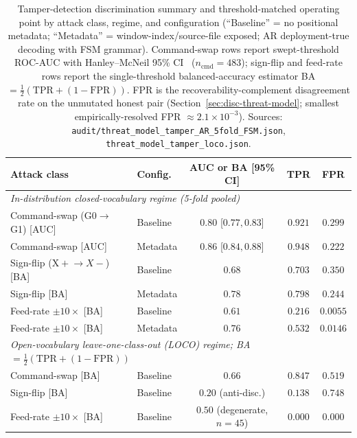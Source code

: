 \documentclass[sensors,article,submit,moreauthors,pdftex]{Definitions/mdpi}
\begin{document}
\begin{table}[!htbp]
\centering
\caption{Tamper-detection discrimination summary and threshold-matched operating point by attack class, regime, and configuration (``Baseline'' = no positional metadata; ``Metadata'' = window-index/source-file exposed; AR deployment-true decoding with FSM grammar). Command-swap rows report swept-threshold ROC-AUC with Hanley--McNeil 95\% CI~\cite{hanley1982meaning} ($n_{\text{cmd}}\!=\!483$); sign-flip and feed-rate rows report the single-threshold balanced-accuracy estimator BA$=\!\tfrac{1}{2}(\mathrm{TPR}+(1-\mathrm{FPR}))$. FPR is the recoverability-complement disagreement rate on the unmutated honest pair (Section~\ref{sec:disc-threat-model}; smallest empirically-resolved FPR $\approx\!2.1\!\times\!10^{-3}$). Sources: \texttt{audit/threat\_model\_tamper\_AR\_5fold\_FSM.json}, \texttt{threat\_model\_tamper\_loco.json}.}
\label{tab:tamper_auc}
\footnotesize
\setlength{\tabcolsep}{4pt}
\begin{tabular}{l l c c c}
\toprule
\textbf{Attack class} & \textbf{Config.} & \textbf{AUC or BA [95\% CI]} & \textbf{TPR} & \textbf{FPR} \\
\midrule
\multicolumn{5}{l}{\emph{In-distribution closed-vocabulary regime (5-fold pooled)}} \\
Command-swap (G0$\to$G1) [AUC]   & Baseline & $0.80$ \tiny{[$0.77, 0.83$]} & $0.921$ & $0.299$ \\
Command-swap [AUC]               & Metadata  & $0.86$ \tiny{[$0.84, 0.88$]} & $0.948$ & $0.222$ \\
Sign-flip (X$\!+\!\to\!X-$) [BA] & Baseline & $0.68$ & $0.703$ & $0.350$ \\
Sign-flip [BA]                   & Metadata  & $0.78$ & $0.798$ & $0.244$ \\
Feed-rate $\pm 10\times$ [BA]    & Baseline & $0.61$ & $0.216$ & $0.0055$ \\
Feed-rate $\pm 10\times$ [BA]    & Metadata  & $0.76$ & $0.532$ & $0.0146$ \\
\midrule
\multicolumn{5}{l}{\emph{Open-vocabulary leave-one-class-out (LOCO) regime; BA$\!=\!\tfrac{1}{2}(\mathrm{TPR}+(1-\mathrm{FPR}))$}} \\
Command-swap [BA]                & Baseline & $0.66$ & $0.847$ & $0.519$ \\
Sign-flip [BA]                   & Baseline & $0.20$ \tiny{(anti-disc.)} & $0.138$ & $0.748$ \\
Feed-rate $\pm 10\times$ [BA]    & Baseline & $0.50$ \tiny{(degenerate, $n\!=\!45$)} & $0.000$ & $0.000$ \\
\bottomrule
\end{tabular}
\end{table}
\end{document}
